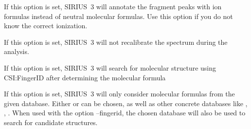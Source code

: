 \documentclass[letterpaper,10pt,openany,oneside]{sphinxmanual}
\begin{document}

\begin{fulllineitems}
\label{commandline:cmdoption--auto-charge}
If this option is set, SIRIUS~3 will annotate the fragment peaks with ion formulas instead of neutral molecular formulas. Use this option if you do not know the correct ionization.

\end{fulllineitems}


\begin{fulllineitems}
\label{commandline:cmdoption--no-recalibrate}
If this option is set, SIRIUS~3 will not recalibrate the spectrum during the analysis.

\end{fulllineitems}


\begin{fulllineitems}
\label{commandline:cmdoption--fingerid}
If this option is set, SIRIUS~3 will search for molecular structure using CSI:FingerID after determining the molecular formula

\end{fulllineitems}


\begin{fulllineitems}
\label{commandline:cmdoption--database}
If this option is set, SIRIUS~3 will only consider molecular formulas from the given database. Either  or  can be chosen, as well as other concrete databases like , , . When used with the option --fingerid, the chosen database will also be used to search for candidate structures.

\end{fulllineitems}

\end{document}
